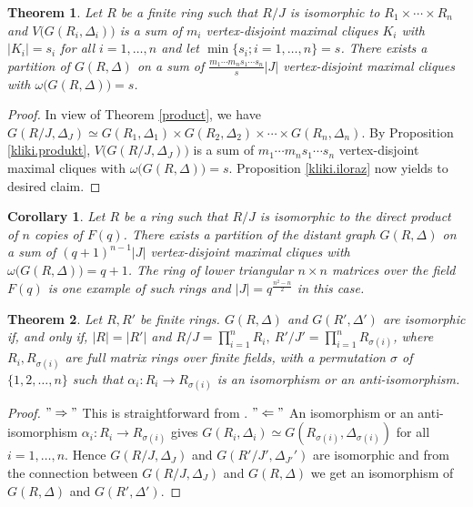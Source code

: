 \documentclass[12pt,a4paper]{article}
\newtheorem{theorem}{Theorem}
\newtheorem{cor}{Corollary}
\theoremstyle{definition}
\begin{document}
\begin{theorem}\label{kliki.radyka}
Let $R$ be a finite ring such that $R/J$ is isomorphic to $R_1\times \cdots\times R_n$ and  $V\bigl(G(R_i, \Delta_i)\bigr)$ is a sum of $m_i$ vertex-disjoint maximal cliques $K_i$ with $|K_i|=s_i$ for all $i=1, \ldots, n$ and let $\min\{s_i; i=1, \ldots, n\}=s$. 
There exists a partition of $G(R, \Delta)$ on a sum of $\frac{m_1 \cdots m_ns_1\cdots s_n}{s}|J|$  vertex-disjoint maximal cliques with $\omega\bigl(G(R, \Delta)\bigr)=s$.
 \end{theorem}
\begin{proof}
In view of Theorem \ref{product}, we have $G(R/J, \Delta_J)\simeq G(R_1, \Delta_1)\times G(R_2, \Delta_2)\times \cdots \times G(R_n, \Delta_n)$.\newline 
By Proposition \ref{kliki.produkt}, $V\bigl(G(R/J, \Delta_J)\bigr)$ is a sum of $m_1 \cdots m_ns_1\cdots s_n$ vertex-disjoint maximal cliques with $\omega\bigl(G(R, \Delta)\bigr)=s$. 
Proposition \ref{kliki.iloraz} now yields to desired claim. 
\end{proof}
\begin{cor}
Let $R$ be a ring such that $R/J$ is isomorphic to the direct product of $n$ copies  of $F(q)$. There exists a partition of the distant graph $G(R, \Delta)$ on a sum of $(q+1)^{n-1}|J|$ vertex-disjoint maximal cliques with $\omega\bigl(G(R, \Delta)\bigr) =q+1$. The ring of lower triangular $n\times n$ matrices over the field $F(q)$ is one example of such rings and $|J|=q^{\frac{n^2-n}{2}}$ in this case.
\end{cor}
\begin{theorem}\label{izo.graph}
Let $R, R'$ be finite rings. $G(R, \Delta)$ and $G(R', \Delta ')$ are isomorphic if, and only if, $|R|=|R'|$ and  $R/J=\prod_{i=1}^nR_i,\ R'/J'=\prod_{i=1}^{n}R_{\sigma(i)}$, where $R_i, R_{\sigma(i)}$ are full matrix rings over finite fields, with a permutation $\sigma$ of $\{1, 2, \ldots, n\}$ such that $\alpha_i:R_i\rightarrow R_{\sigma(i)}$ is an isomorphism or an anti-isomorphism.
\end{theorem}
 \begin{proof}
$"\Rightarrow"$ This is straightforward from \cite[Corollary 6.8]{hav3}.\newline
$"\Leftarrow"$  An isomorphism or an anti-isomorphism $\alpha_i:R_i\rightarrow R_{\sigma(i)}$ gives $G(R_i, 
\Delta_i)\simeq G(R_{\sigma(i)}, \Delta_{\sigma(i)})$ for all $i=1, \ldots, n$. Hence $G(R/J, \Delta_J)$ and $G(R'/J', \Delta_{J'}')$ are isomorphic and from the connection between $G(R/J, \Delta_J)$ and $G(R, \Delta)$ we get an isomorphism of $G(R, \Delta)$ and $G(R', \Delta ')$.
\end{proof}
\end{document}
